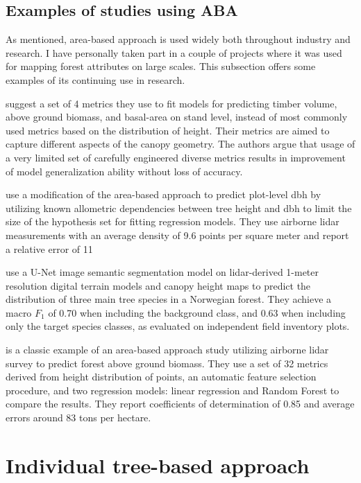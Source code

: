 \subsection{Examples of studies using ABA}

As mentioned, area-based approach is used widely both throughout industry and research.
I have personally taken part in a couple of projects where it was used for mapping forest attributes on large scales.
This subsection offers some examples of its continuing use in research.

\citet{bouvierGeneralizingPredictiveModels2015} suggest a set of 4 metrics they use to fit models for predicting timber volume, above ground biomass, and basal-area on stand level, instead of most commonly used metrics based on the distribution of height.
Their metrics are aimed to capture different aspects of the canopy geometry.
The authors argue that usage of a very limited set of carefully engineered diverse metrics results in improvement of model generalization ability without loss of accuracy.

\citet{zhangImprovedAreabasedApproach2023} use a modification of the area-based approach to predict plot-level \gls{dbh} by utilizing known allometric dependencies between tree height and \gls{dbh} to limit the size of the hypothesis set for fitting regression models.
They use airborne \gls{lidar} measurements with an average density of 9.6 points per square meter and report a relative error of 11%

\citet{vermeerLidarbasedNorwegianTree2023} use a U-Net \citep{ronnebergerUNetConvolutionalNetworks2015} image semantic segmentation model on \gls{lidar}-derived 1-meter resolution digital terrain models and canopy height maps to predict the distribution of three main tree species in a Norwegian forest.
They achieve a macro $F_1$ of 0.70 when including the background class, and 0.63 when including only the target species classes, as evaluated on independent field inventory plots.

\citet{kcEstimationAboveGroundForest2024} is a classic example of an area-based approach study utilizing airborne \gls{lidar} survey to predict forest above ground biomass.
They use a set of 32 metrics derived from height distribution of points, an automatic feature selection procedure, and two regression models: linear regression and Random Forest to compare the results.
They report coefficients of determination of 0.85 and average errors around 83 tons per hectare.


\section{Individual tree-based approach}\label{sec-individual-tree-approach}

